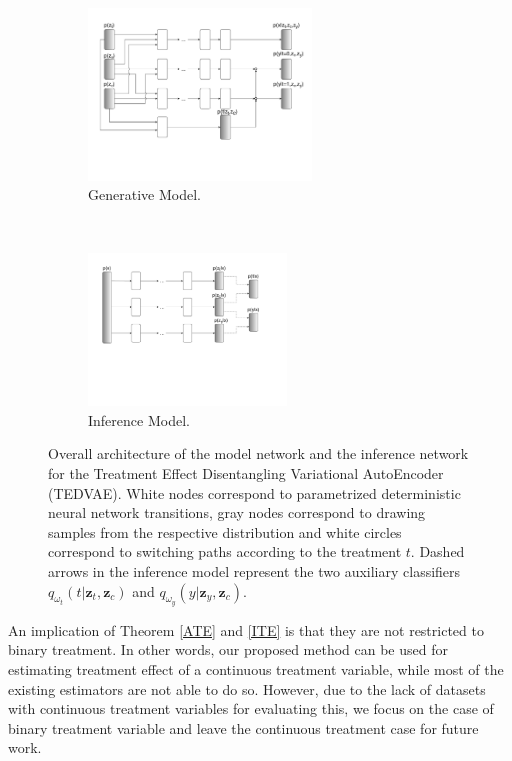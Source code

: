 \documentclass[letterpaper]{article} %
\begin{document}
\begin{figure}[!t]
\centering
\begin{subfigure}[b]{0.96\columnwidth}
\centering
\includegraphics[height=1.8in]{generative.pdf}
\caption{Generative Model.}
\end{subfigure}
~
\begin{subfigure}[b]{0.96\columnwidth}
\centering
\includegraphics[height=1.6in]{inference.pdf}
\caption{Inference Model.}
\end{subfigure}
\caption{Overall architecture of the model network and the inference network for the Treatment  Effect Disentangling Variational AutoEncoder (TEDVAE). White nodes correspond to parametrized deterministic neural network transitions, gray nodes correspond to drawing samples from the respective distribution and white circles correspond to switching paths according to the treatment $t$. Dashed arrows in the inference model represent the two auxiliary classifiers $q_{\omega_t}(t|\mathbf{z}_t,\mathbf{z}_c)$ and $q_{\omega_y} (y|\mathbf{z}_y,\mathbf{z}_c)$.}
\label{architecture}
\end{figure}

An implication of Theorem \ref{ATE} and \ref{ITE} is that they are not restricted to binary treatment. In other words, our proposed method can be used for estimating treatment effect of a continuous treatment variable, while most of the existing estimators are not able to do so. However, due to the lack of datasets with continuous treatment variables for evaluating this, we focus on the case of binary treatment variable and leave the continuous treatment case for future work.
\end{document}
